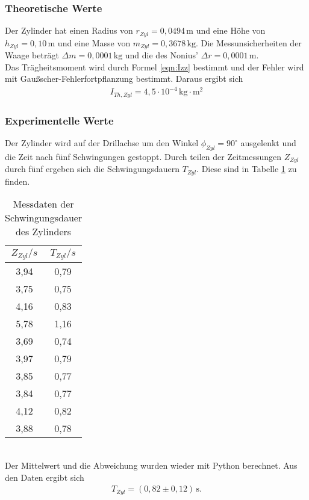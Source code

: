 \subsubsection{Theoretische Werte}
Der Zylinder hat einen Radius von $r_{Zyl} = 0{,}0494 \, \mathrm{m}$ und eine Höhe von $h_{Zyl} = 0{,}10 \, \mathrm{m}$
und eine Masse von $m_{Zyl} = 0{,}3678 \, \mathrm{kg}$.
Die Messunsicherheiten der Waage beträgt $\Delta m = 0,0001\, \mathrm{kg}$ und die des Nonius' $\Delta r = 0,0001\, \mathrm{m}$.\\
Das Trägheitsmoment wird durch Formel \ref{eqn:Izz} bestimmt und der Fehler wird mit Gaußscher-Fehlerfortpflanzung bestimmt.
Daraus ergibt sich
\begin{align}
  I_{Th, Zyl} = 4{,}5 \cdot 10^{-4} \, \mathrm{kg}\cdot\mathrm{m^2}
\end{align}


\subsubsection{Experimentelle Werte}
Der Zylinder wird auf der Drillachse um den Winkel $\phi_{Zyl} = 90^{\circ}$ ausgelenkt und die Zeit
nach fünf Schwingungen gestoppt.
Durch teilen der Zeitmessungen $Z_{Zyl}$ durch fünf ergeben sich die Schwingungsdauern $T_{Zyl}$. 
Diese sind in Tabelle \ref{tab:T_Zyl} zu finden.
\begin{table}
  \centering
  \caption{Messdaten der Schwingungsdauer des Zylinders}
  \label{tab:T_Zyl}
  \begin{tabular}{c c}
    \toprule
    $Z_{Zyl}/s$ & $T_{Zyl}/s$ \\
    \midrule
    3,94 & 0,79 \\
    3,75 & 0,75 \\
    4,16 & 0,83 \\
    5,78 & 1,16 \\
    3,69 & 0,74 \\
    3,97 & 0,79 \\
    3,85 & 0,77 \\
    3,84 & 0,77 \\
    4,12 & 0,82 \\
    3,88 & 0,78 \\
    \bottomrule
  \end{tabular}
\end{table}
\\
Der Mittelwert und die Abweichung wurden wieder mit Python berechnet.
Aus den Daten ergibt sich
\begin{align*}
  T_{Zyl} = (0{,}82 \pm 0{,}12)\, \mathrm{s} .
\end{align*}

